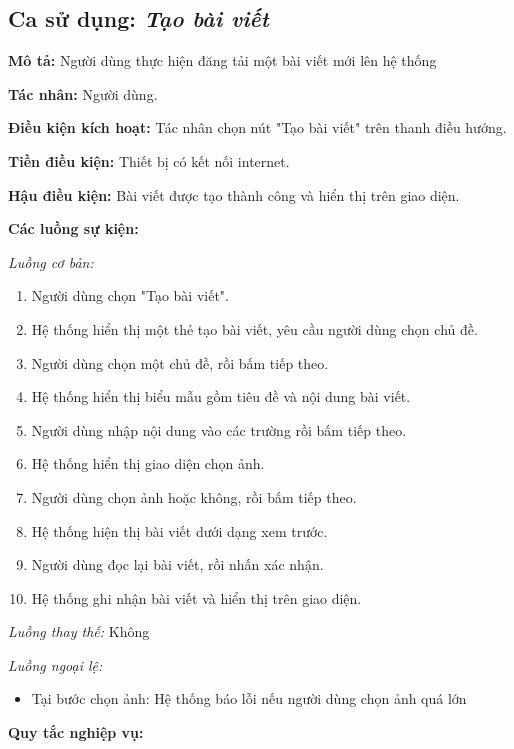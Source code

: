 \documentclass[../main.tex]{subfiles}
\begin{document}
\subsection{Ca sử dụng: \textit{Tạo bài viết}}

\noindent
\textbf{Mô tả:} Người dùng thực hiện đăng tải một bài viết mới lên hệ thống

\noindent
\textbf{Tác nhân:} Người dùng.

\noindent
\textbf{Điều kiện kích hoạt:} Tác nhân chọn nút "Tạo bài viết" trên thanh điều hướng.

\noindent
\textbf{Tiền điều kiện:} Thiết bị có kết nối internet.

\noindent
\textbf{Hậu điều kiện:} Bài viết được tạo thành công và hiển thị trên giao diện.

\noindent
\textbf{Các luồng sự kiện:}

\noindent
\textit{Luồng cơ bản:}

\begin{enumerate}[label=B\arabic{*}.]
    \item Người dùng chọn "Tạo bài viết".
    \item Hệ thống hiển thị một thẻ tạo bài viết, yêu cầu người dùng chọn chủ đề.
    \item Người dùng chọn một chủ đề, rồi bấm tiếp theo.
    \item Hệ thống hiển thị biểu mẫu gồm tiêu đề và nội dung bài viết. 
    \item Người dùng nhập nội dung vào các trường rồi bấm tiếp theo.
    \item Hệ thống hiển thị giao diện chọn ảnh.
    \item Người dùng chọn ảnh hoặc không, rồi bấm tiếp theo.
    \item Hệ thống hiện thị bài viết dưới dạng xem trước.
    \item Người dùng đọc lại bài viết, rồi nhấn xác nhận.
    \item Hệ thống ghi nhận bài viết và hiển thị trên giao diện.
\end{enumerate}

\noindent
\textit{Luồng thay thế:} Không

\noindent
\textit{Luồng ngoại lệ:}

\begin{itemize}
  \item Tại bước chọn ảnh: Hệ thống báo lỗi nếu người dùng chọn ảnh quá lớn
\end{itemize}

\noindent
\textbf{Quy tắc nghiệp vụ:}
\end{document}
